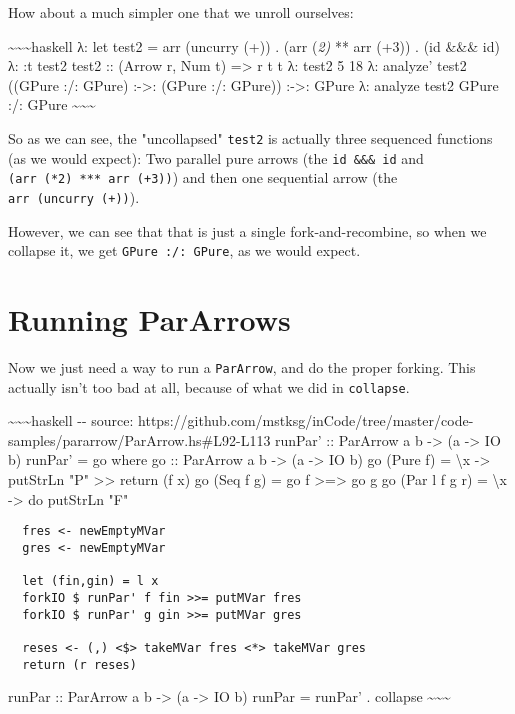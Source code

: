 \documentclass[]{article}
\begin{document}
How about a much simpler one that we unroll ourselves:

\textasciitilde{}\textasciitilde{}\textasciitilde{}haskell λ: let test2 = arr
(uncurry (+)) \textbar{} . (arr (\emph{2) }** arr (+3)) \textbar{} . (id \&\&\&
id) λ: :t test2 test2 :: (Arrow r, Num t) =\textgreater{} r t t λ: test2 5 18 λ:
analyze' test2 ((GPure :/: GPure) :-\textgreater{}: (GPure :/: GPure))
:-\textgreater{}: GPure λ: analyze test2 GPure :/: GPure
\textasciitilde{}\textasciitilde{}\textasciitilde{}

So as we can see, the "uncollapsed" \texttt{test2} is actually three sequenced
functions (as we would expect): Two parallel pure arrows (the
\texttt{id\ \&\&\&\ id} and \texttt{(arr\ (*2)\ ***\ arr\ (+3))}) and then one
sequential arrow (the \texttt{arr\ (uncurry\ (+))}).

However, we can see that that is just a single fork-and-recombine, so when we
collapse it, we get \texttt{GPure\ :/:\ GPure}, as we would expect.

\section{Running ParArrows}

Now we just need a way to run a \texttt{ParArrow}, and do the proper forking.
This actually isn't too bad at all, because of what we did in \texttt{collapse}.

\textasciitilde{}\textasciitilde{}\textasciitilde{}haskell -\/- source:
https://github.com/mstksg/inCode/tree/master/code-samples/pararrow/ParArrow.hs\#L92-L113
runPar' :: ParArrow a b -\textgreater{} (a -\textgreater{} IO b) runPar' = go
where go :: ParArrow a b -\textgreater{} (a -\textgreater{} IO b) go (Pure f) =
\textbackslash{}x -\textgreater{} putStrLn "P" \textgreater{}\textgreater{}
return (f x) go (Seq f g) = go f \textgreater{}=\textgreater{} go g go (Par l f
g r) = \textbackslash{}x -\textgreater{} do putStrLn "F"

\begin{verbatim}
  fres <- newEmptyMVar
  gres <- newEmptyMVar

  let (fin,gin) = l x
  forkIO $ runPar' f fin >>= putMVar fres
  forkIO $ runPar' g gin >>= putMVar gres

  reses <- (,) <$> takeMVar fres <*> takeMVar gres
  return (r reses)
\end{verbatim}

runPar :: ParArrow a b -\textgreater{} (a -\textgreater{} IO b) runPar = runPar'
. collapse \textasciitilde{}\textasciitilde{}\textasciitilde{}
\end{document}
